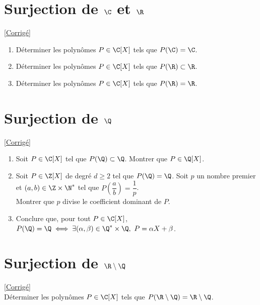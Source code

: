 \documentclass{book}
\begin{document}
	\section{Surjection de $\C$ et $\R$ }
	\textcolor{blue}{\hyperref[Surjection de C et R corrigé]{[Corrigé]}}\\
	\label{Surjection de C et R}
	\begin{enumerate}[leftmargin=*]
		\item Déterminer les polynômes $P\in \C[X]$ tels que $P(\C)=\C$.
		\item Déterminer les polynômes $P\in \C[X]$ tels que $P(\R)\subset \R$.
		\item Déterminer les polynômes $P\in \C[X]$ tels que $P(\R)=\R$.
	\end{enumerate}
	
	\section{Surjection de $\Q$ }
	\textcolor{blue}{\hyperref[Surjection de Q corrigé]{[Corrigé]}}\\
	\label{Surjection de Q}
	\begin{enumerate}[leftmargin=*]
		\item Soit $P\in \C[X]$ tel que $P(\Q)\subset \Q$. Montrer que $P\in \Q[X]$.
		\item Soit $P\in \Z[X]$ de degré $d\geq 2$ tel que $P(\Q)=\Q$.	Soit $p$ un nombre premier et $(a,b)\in \Z\times \N^*$ tel que $P\left(\dfrac{a}{b}\right)=\dfrac{1}{p}$.\\
		Montrer que $p$ divise le coefficient dominant de $P$.
		\item Conclure que, pour tout $P\in \C[X]$, $P(\Q)=\Q\iff \exists (\alpha,\beta)\in \Q^*\times \Q,\ P=\alpha X+\beta$.
	\end{enumerate}
	
	\section{Surjection de $\R\setminus\Q$ }
	\textcolor{blue}{\hyperref[Surjection de R-Q corrigé]{[Corrigé]}}\\
	\label{Surjection de R-Q}
	Déterminer les polynômes $P\in \C[X]$ tels que $P(\R\setminus\Q)=\R\setminus\Q$.
	
\end{document}
